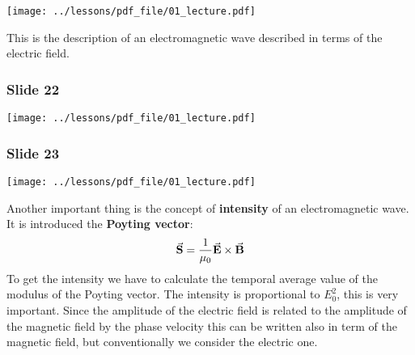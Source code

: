 \documentclass[../main/main.tex]{subfiles}
\begin{document}
\begin{minipage}[]{0.5\linewidth}
\centering
\texttt{[image: ../lessons/pdf\_file/01\_lecture.pdf]}
\end{minipage}
\hspace{0.3cm}\vspace{0.3cm}
\begin{minipage}[c]{0.47\linewidth}
This is the description of an electromagnetic wave described in terms of the electric field.
\end{minipage}

\subsubsection*{Slide 22}

\begin{minipage}[]{0.5\linewidth}
\centering
\texttt{[image: ../lessons/pdf\_file/01\_lecture.pdf]}
\end{minipage}
\hspace{0.3cm}\vspace{0.3cm}
\begin{minipage}[c]{0.47\linewidth}

\end{minipage}

\subsubsection*{Slide 23}

\begin{minipage}[]{0.5\linewidth}
\centering
\texttt{[image: ../lessons/pdf\_file/01\_lecture.pdf]}
\end{minipage}
\hspace{0.3cm}\vspace{0.3cm}
\begin{minipage}[c]{0.47\linewidth}
Another important thing is the concept of \textbf{intensity} of an electromagnetic wave.
It is introduced the \textbf{Poyting vector}:
\begin{equation*}
  \va{S} = \frac{1}{\mu _0} \va{E} \times \va{B}
\end{equation*}
To get the intensity we have to calculate the temporal average value of the modulus of the Poyting vector. The intensity is proportional to \( E_0^2 \), this is very important. Since the amplitude of the electric field is related to the amplitude of the magnetic field by the phase velocity this can be written also in term of the magnetic field, but conventionally we consider the electric one.
\end{minipage}
\end{document}
